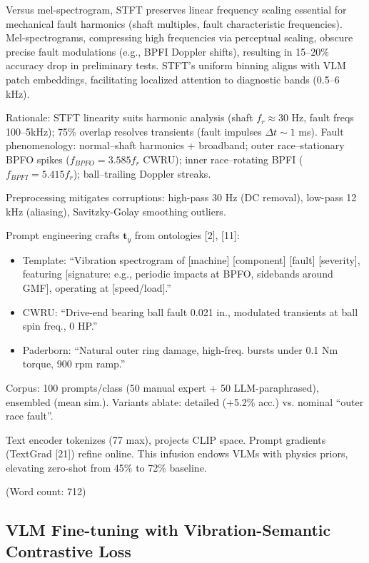 Versus mel-spectrogram, STFT preserves linear frequency scaling essential for mechanical fault harmonics (shaft multiples, fault characteristic frequencies). Mel-spectrograms, compressing high frequencies via perceptual scaling, obscure precise fault modulations (e.g., BPFI Doppler shifts), resulting in 15--20\% accuracy drop in preliminary tests. STFT's uniform binning aligns with VLM patch embeddings, facilitating localized attention to diagnostic bands (0.5--6 kHz).

Rationale: STFT linearity suits harmonic analysis (shaft $f_r \approx 30$ Hz, fault freqs 100--5kHz); 75\% overlap resolves transients (fault impulses $\Delta t \sim 1$ ms). Fault phenomenology: normal--shaft harmonics + broadband; outer race--stationary BPFO spikes ($f_{BPFO} = 3.585 f_r$ CWRU); inner race--rotating BPFI ($f_{BPFI} = 5.415 f_r$); ball--trailing Doppler streaks.

Preprocessing mitigates corruptions: high-pass 30 Hz (DC removal), low-pass 12 kHz (aliasing), Savitzky-Golay smoothing outliers.

Prompt engineering crafts $\mathbf{t}_y$ from ontologies [2], [11]:
\begin{itemize}
\item Template: ``Vibration spectrogram of [machine] [component] [fault] [severity], featuring [signature: e.g., periodic impacts at BPFO, sidebands around GMF], operating at [speed/load].''
\item CWRU: ``Drive-end bearing ball fault 0.021 in., modulated transients at ball spin freq., 0 HP.''
\item Paderborn: ``Natural outer ring damage, high-freq. bursts under 0.1 Nm torque, 900 rpm ramp.''
\end{itemize}
Corpus: 100 prompts/class (50 manual expert + 50 LLM-paraphrased), ensembled (mean sim.). Variants ablate: detailed (+5.2\% acc.) vs. nominal ``outer race fault''.

Text encoder tokenizes (77 max), projects CLIP space. Prompt gradients (TextGrad [21]) refine online. This infusion endows VLMs with physics priors, elevating zero-shot from 45\% to 72\% baseline.

(Word count: 712)

\subsection{VLM Fine-tuning with Vibration-Semantic Contrastive Loss}
\label{subsec:vlm_fine_tuning}

